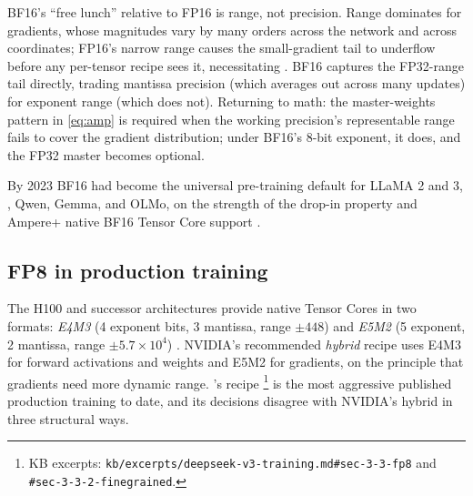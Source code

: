 \begin{intuition}
BF16's ``free lunch'' relative to FP16 is range, not precision. Range
dominates for gradients, whose magnitudes vary by many orders across
the network and across coordinates; FP16's narrow range causes the
small-gradient tail to underflow before any per-tensor recipe sees it,
necessitating . BF16 captures the FP32-range tail directly,
trading mantissa precision (which averages out across many updates) for
exponent range (which does not). Returning to math: the master-weights
pattern in \cref{eq:amp} is required when the working precision's
representable range fails to cover the gradient distribution; under
BF16's 8-bit exponent, it does, and the FP32 master becomes optional.
\end{intuition}

By 2023 BF16 had become the universal pre-training default for LLaMA
2 and 3, , Qwen, Gemma, and OLMo, on the strength of the
drop-in property and Ampere+ native BF16 Tensor Core support
\citep[\S 2.2.4]{torchtitan2024}.

\subsection{FP8 in production training}
\label{sec:mp-fp8}

The H100 and successor architectures provide native  Tensor Cores
in two formats: \emph{E4M3} (4 exponent bits, 3 mantissa, range
$\pm 448$) and \emph{E5M2} (5 exponent, 2 mantissa, range $\pm
5.7\times 10^{4}$) \citep[\S 3.3]{deepseek-v3}. NVIDIA's recommended
\emph{hybrid} recipe uses E4M3 for forward activations and weights
and E5M2 for gradients, on the principle that gradients need more
dynamic range. 's recipe \citep[\S 3.3.1, \S
3.3.2]{deepseek-v3}\footnote{KB excerpts:
\nolinkurl{kb/excerpts/deepseek-v3-training.md#sec-3-3-fp8} and
\texttt{\#sec-3-3-2-finegrained}.} is the most aggressive published
production  training to date, and its decisions disagree with
NVIDIA's hybrid in three structural ways.

